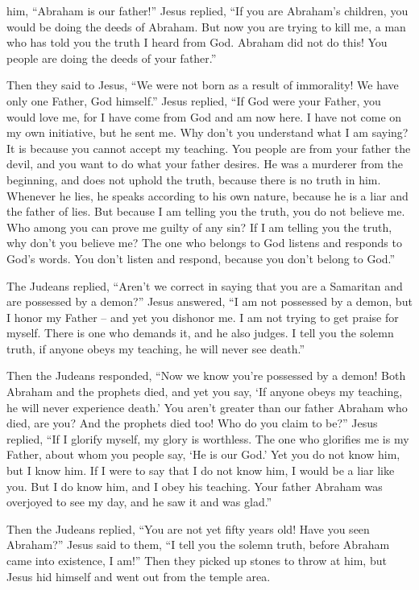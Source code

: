 {him, “Abraham
is
our
father!” Jesus
replied, “If
you are
Abraham’s
children,
you would be doing
the deeds
of Abraham.
But
now
you are trying
to kill
me,
a man
who
has told
you
the truth
I heard
from
God.
Abraham
did
not
do
this!
You
people are doing
the deeds
of
your
father.”
\par }{\PP Then they said
to Jesus, “We
were
not
born
as a result of
immorality! We have
only one
Father,
God himself.”
Jesus
replied, “If
God
were your
Father,
you would love
me,
for
I
have come
from
God
and
am now here. I have
not
come
on my own initiative,
but
he sent
me.
Why
don’t
you understand
what I
am saying? It is because
you cannot
accept
my
teaching.
You
people are
from
your father
the
devil,
and
you want
to do
what your
father
desires.
He
was
a murderer
from
the beginning,
and
does
not
uphold
the
truth,
because
there is
no
truth
in
him.
Whenever
he lies,
he speaks
according to
his own
nature, because
he is
a liar
and
the
father
of lies.
But
because
I
am telling
you the truth,
you do
not
believe
me.
Who
among
you
can prove
me
guilty
of any
sin? If
I am telling
you
the truth,
why
don’t
you believe
me?
The one who
belongs
to God
listens and responds
to God’s
words.
You
don’t
listen and respond,
because
you
don’t
belong
to
God.”
\par }{\PP {}The Judeans
replied, “Aren’t
we
correct
in saying
that
you
are
a Samaritan
and
are possessed by
a demon?”
Jesus
answered,
“I
am
not
possessed by
a demon,
but
I honor
my
Father
– and
yet you
dishonor
me.
I
am
not
trying to get
praise
for myself.
There is
one who demands
it, and
he also judges.
I tell
you
the solemn truth,
if
anyone
obeys
my
teaching,
he will
never
see
death.”
\par }{\PP {}Then the Judeans
responded, “Now
we know
you’re possessed
by a demon! Both Abraham
and
the prophets
died,
and
yet you
say,
‘If
anyone
obeys
my
teaching,
he will
never
experience
death.’
You
aren’t
greater than
our
father
Abraham
who
died,
are you? And
the prophets
died
too! Who
do you claim
to be?”
Jesus
replied, “If
I
glorify
myself,
my
glory
is
worthless.
The one who glorifies
me
is
my
Father,
about whom
you
people say,
‘He is
our
God.’
Yet
you do
not
know
him,
but
I
know
him.
If
I were to say
that
I do
not
know
him,
I would be
a liar
like
you.
But
I do know
him,
and
I obey
his
teaching.
Your
father
Abraham
was overjoyed
to
see
my
day,
and
he saw
it and
was glad.”
\par }{\PP {}Then
the Judeans
replied, “You are
not yet
fifty
years
old! Have you seen
Abraham?”
Jesus
said
to them,
“I tell
you
the solemn truth,
before
Abraham
came into existence,
I
am!”
Then
they picked up
stones
to
throw
at
him,
but
Jesus
hid
himself and
went out
from
the temple area.

}
